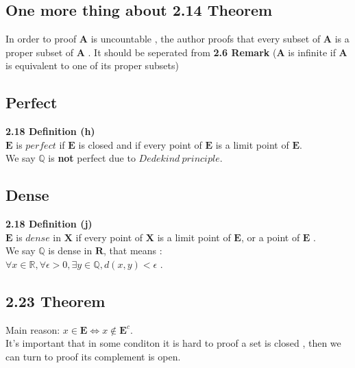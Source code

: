 \documentclass{report}
\begin{document}
            \subsection*{One more thing about 2.14 Theorem}
            In order to proof $\mathbf{A}$ is uncountable , the author proofs that 
            every subset of  $\mathbf{A}$ is a proper subset of $\mathbf{A}$ .
            It should be seperated from \textbf{2.6 Remark}
            ($\mathbf{A}$ is infinite if $\mathbf{A}$ is equivalent to one of its proper subsets)

            \subsection*{Perfect}
            \textbf{2.18 Definition (h)}\\
            $\mathbf{E}$ is $\mathit{perfect}$ if $\mathbf{E}$ is closed and if every point of $\mathbf{E}$ is a limit point of $\mathbf{E}$.\\
            We say $\mathbb{Q}$ is \textbf{not} perfect due to $\mathit{Dedekind \  principle}$.
            
            \subsection*{Dense}
            \textbf{2.18 Definition (j)}\\
            $\mathbf{E}$ is $\mathit{dense}$ in $\mathbf{X}$ if every point of $\mathbf{X}$ is a limit point of $\mathbf{E}$, or a point of $\mathbf{E}$ .\\
            We say $\mathbb{Q}$ is dense in $\mathbf{R}$, that means :\\
            $\forall x \in \mathbb{R} , \forall \epsilon > 0 , \exists y \in \mathbb{Q} , d(x,y) < \epsilon $ .
            
            \subsection*{2.23 Theorem}
            Main reason: $x \in \mathbf{E} \Longleftrightarrow x \notin  \mathbf{E}^c$.\\
            It's important that in some conditon it is hard to proof a set is closed , then we can turn to proof its complement is open.
\end{document}
